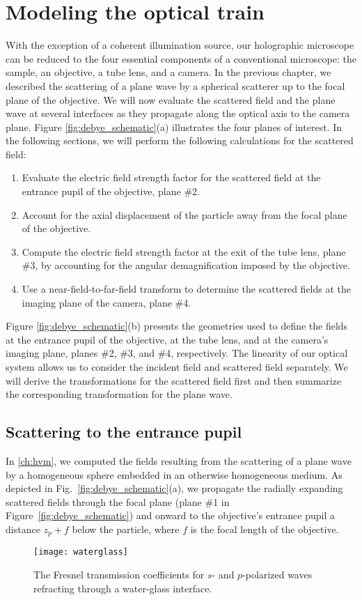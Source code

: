 \section{Modeling the optical train}

With the exception of a coherent illumination source, our holographic microscope
can be reduced to the four essential components of a conventional microscope:
the sample, an objective, a tube lens, and a camera. In the previous chapter,
we described the scattering of a plane wave by a spherical scatterer up to
the focal plane of the objective. We will now evaluate the scattered field and
the plane wave at several interfaces as they propagate along the optical axis
to the camera plane. Figure \ref{fig:debye_schematic}(a) illustrates the four planes
of interest. In the following sections, we will perform the following calculations
for the scattered field:
\begin{enumerate}
\item Evaluate the electric field strength factor for the scattered field at
  the entrance pupil of the objective, plane \#\num{2}.
\item Account for the axial displacement of the particle away from the focal
  plane of the objective.
\item Compute the electric field strength factor at the exit of the tube lens, plane \#3,
  by accounting for the angular demagnification imposed by the objective.
\item Use a near-field-to-far-field transform to determine the scattered
  fields at the imaging plane of the camera, plane \#\num{4}.
\end{enumerate}
Figure \ref{fig:debye_schematic}(b) presents the geometries used to define the
fields at the entrance pupil of the objective, at the tube lens, and at the camera's
imaging plane, planes \#\num{2}, \#\num{3}, and \#\num{4}, respectively.
The linearity of our optical system allows us to consider the incident field
and scattered field separately. We will derive the transformations for the
scattered field first and then summarize the corresponding transformation for the
plane wave.

\subsection{Scattering to the entrance pupil}

In \autoref{ch:hvm}, we computed the fields resulting from the scattering of
a plane wave by a homogeneous sphere embedded in an otherwise
homogeneous medium. As depicted in Fig.~\ref{fig:debye_schematic}(a), we
propagate the radially expanding scattered fields through the focal plane (plane \#\num{1} in
Figure~\ref{fig:debye_schematic}) and onward to the objective's entrance pupil a distance
$z_p + f$ below the particle, where $f$ is the focal length of the objective.
\begin{figure}
  \centering
  \texttt{[image: waterglass]}
  \caption{The Fresnel transmission coefficients for $s$- and $p$-polarized
  waves refracting through a water-glass interface.}
  \label{fig:waterglass}
\end{figure}

